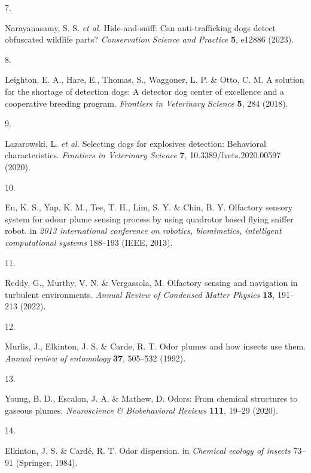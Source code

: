 \documentclass[
]{article}
\newlength{\cslhangindent}
\newlength{\csllabelwidth}
\newlength{\cslentryspacingunit} %
\newenvironment{CSLReferences}[2] %
 {%
  \setlength{\parindent}{0pt}
  \ifodd #1
  \let\oldpar\par
  \def\par{\hangindent=\cslhangindent\oldpar}
  \fi
  \setlength{\parskip}{#2\cslentryspacingunit}
 }%
 {}
\newcommand{\CSLLeftMargin}[1]{\parbox[t]{\csllabelwidth}{#1}}
\newcommand{\CSLRightInline}[1]{\parbox[t]{\linewidth - \csllabelwidth}{#1}\break}
\begin{document}
\begin{CSLReferences}{0}{0}
\leavevmode{}%
\CSLLeftMargin{7. }%
\CSLRightInline{Narayanasamy, S. S. \emph{et al.} Hide-and-sniff: Can anti-trafficking dogs detect obfuscated wildlife parts? \emph{Conservation Science and Practice} \textbf{5}, e12886 (2023).}

\leavevmode{}%
\CSLLeftMargin{8. }%
\CSLRightInline{Leighton, E. A., Hare, E., Thomas, S., Waggoner, L. P. \& Otto, C. M. A solution for the shortage of detection dogs: A detector dog center of excellence and a cooperative breeding program. \emph{Frontiers in Veterinary Science} \textbf{5}, 284 (2018).}

\leavevmode{}%
\CSLLeftMargin{9. }%
\CSLRightInline{Lazarowski, L. \emph{et al.} Selecting dogs for explosives detection: Behavioral characteristics. \emph{Frontiers in Veterinary Science} \textbf{7}, 10.3389/fvets.2020.00597 (2020).}

\leavevmode{}%
\CSLLeftMargin{10. }%
\CSLRightInline{Eu, K. S., Yap, K. M., Tee, T. H., Lim, S. Y. \& Chin, B. Y. Olfactory sensory system for odour plume sensing process by using quadrotor based flying sniffer robot. in \emph{2013 international conference on robotics, biomimetics, intelligent computational systems} 188--193 (IEEE, 2013).}

\leavevmode{}%
\CSLLeftMargin{11. }%
\CSLRightInline{Reddy, G., Murthy, V. N. \& Vergassola, M. Olfactory sensing and navigation in turbulent environments. \emph{Annual Review of Condensed Matter Physics} \textbf{13}, 191--213 (2022).}

\leavevmode{}%
\CSLLeftMargin{12. }%
\CSLRightInline{Murlis, J., Elkinton, J. S. \& Carde, R. T. Odor plumes and how insects use them. \emph{Annual review of entomology} \textbf{37}, 505--532 (1992).}

\leavevmode{}%
\CSLLeftMargin{13. }%
\CSLRightInline{Young, B. D., Escalon, J. A. \& Mathew, D. Odors: From chemical structures to gaseous plumes. \emph{Neuroscience \& Biobehavioral Reviews} \textbf{111}, 19--29 (2020).}

\leavevmode{}%
\CSLLeftMargin{14. }%
\CSLRightInline{Elkinton, J. S. \& Cardé, R. T. Odor dispersion. in \emph{Chemical ecology of insects} 73--91 (Springer, 1984).}


\end{CSLReferences}
\end{document}
